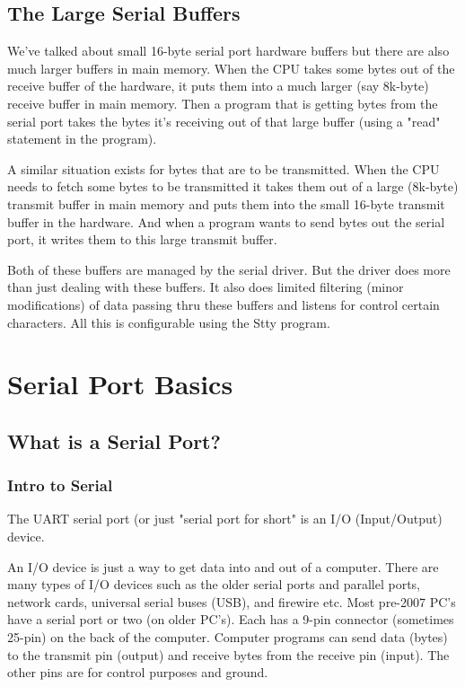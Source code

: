 \documentclass[11pt, twosides, titlepage]{article}
\begin{document}
    \subsection{The Large Serial Buffers}

        We've talked about small 16-byte serial port hardware buffers but there are also much larger buffers in main memory. When the CPU takes some bytes out of the receive buffer of the hardware, it puts them into a much larger (say 8k-byte) receive buffer in main memory. Then a program that is getting bytes from the serial port takes the bytes it's receiving out of that large buffer (using a "read" statement in the program).

        A similar situation exists for bytes that are to be transmitted. When the CPU needs to fetch some bytes to be transmitted it takes them out of a large (8k-byte) transmit buffer in main memory and puts them into the small 16-byte transmit buffer in the hardware. And when a program wants to send bytes out the serial port, it writes them to this large transmit buffer.
        
        Both of these buffers are managed by the serial driver. But the driver does more than just dealing with these buffers. It also does limited filtering (minor modifications) of data passing thru these buffers and listens for control certain characters. All this is configurable using the Stty program.

\section{Serial Port Basics}

    \subsection{What is a Serial Port?}

        \subsubsection{Intro to Serial}

            The UART serial port (or just "serial port for short" is an I/O (Input/Output) device.

            An I/O device is just a way to get data into and out of a computer. There are many types of I/O devices such as the older serial ports and parallel ports, network cards, universal serial buses (USB), and firewire etc. Most pre-2007 PC's have a serial port or two (on older PC's). Each has a 9-pin connector (sometimes 25-pin) on the back of the computer. Computer programs can send data (bytes) to the transmit pin (output) and receive bytes from the receive pin (input). The other pins are for control purposes and ground.
            
\end{document}

